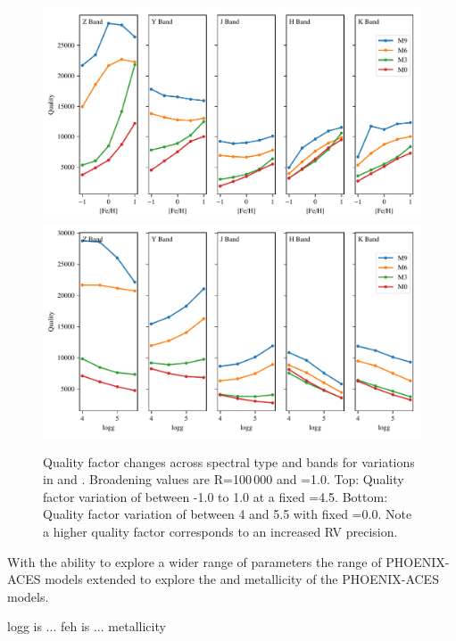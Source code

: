 \begin{figure}
    \includegraphics[width=0.95\linewidth]{figures/information-content/metalicity_effect.pdf}\\
    \includegraphics[width=0.95\linewidth]{figures/information-content/logg_effect.pdf}
    \caption[Quality factor verse \feh{} and \Logg{} for different spectral types and wavelength bands.]{Quality factor changes across spectral type and bands for variations in \feh{} and \Logg{}.
        Broadening values are R=100\,000 and \Vsini{}=1.0\kmps{}.
        Top: Quality factor variation of \feh{} between -1.0 to 1.0 at a fixed \Logg{}=4.5.
        Bottom: Quality factor variation of \Logg{} between 4 and 5.5 with fixed \feh{}=0.0.
        Note a higher quality factor corresponds to an increased {RV} precision.}
    \label{fig:logg_metalicity_deviations}
\end{figure}

With the ability to explore a wider range of parameters the range of {PHOENIX-ACES} models extended to explore the \Logg{} and metallicity of the {PHOENIX-ACES} models.

logg is ...
feh is ... metallicity 

